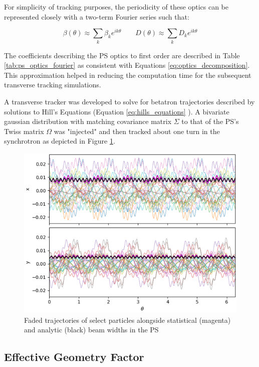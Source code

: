 For simplicity of tracking purposes, the periodicity of these optics can be represented closely with a two-term Fourier series such that:

\begin{equation}
    \beta(\theta) \approx \sum_k \beta_k e^{i k\theta} \qquad D(\theta) \approx \sum_k D_k e^{i k\theta}
    \label{eq:optics_decomposition}
\end{equation}

The coefficients describing the PS optics to first order are described in Table \ref{tab:ps_optics_fourier} as consistent with Equations \ref{eq:optics_decomposition}. This approximation helped in reducing the computation time for the subsequent transverse tracking simulations.



A transverse tracker was developed to solve for betatron trajectories described by solutions to Hill's Equations (Equation  \ref{eq:hills_equations} ). A bivariate gaussian distribution with matching covariance matrix $\Sigma$ to that of the PS's Twiss matrix $\Omega$ was "injected" and then tracked about one turn in the synchrotron as depicted in Figure \ref{fig:trans_tracking}.

\begin{figure}
    \centering
    \includegraphics{figs/transverse_tracking.png}
    \caption{Faded trajectories of select particles alongside statistical (magenta) and analytic (black) beam widths in the PS}
    \label{fig:trans_tracking}
\end{figure}

\subsection{Effective Geometry Factor}

